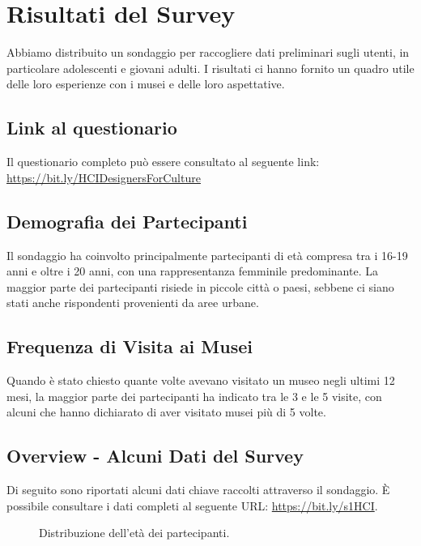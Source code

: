 \documentclass{article}
\begin{document}
\section{Risultati del Survey}

Abbiamo distribuito un sondaggio per raccogliere dati preliminari sugli utenti, in particolare adolescenti e giovani adulti. I risultati ci hanno fornito un quadro utile delle loro esperienze con i musei e delle loro aspettative.

\subsection{Link al questionario}

Il questionario completo può essere consultato al seguente link: \url{https://bit.ly/HCIDesignersForCulture}

\subsection{Demografia dei Partecipanti}

Il sondaggio ha coinvolto principalmente partecipanti di età compresa tra i 16-19 anni e oltre i 20 anni, con una rappresentanza femminile predominante. La maggior parte dei partecipanti risiede in piccole città o paesi, sebbene ci siano stati anche rispondenti provenienti da aree urbane.

\subsection{Frequenza di Visita ai Musei}

Quando è stato chiesto quante volte avevano visitato un museo negli ultimi 12 mesi, la maggior parte dei partecipanti ha indicato tra le 3 e le 5 visite, con alcuni che hanno dichiarato di aver visitato musei più di 5 volte.
\newpage
\subsection{Overview - Alcuni Dati del Survey}
Di seguito sono riportati alcuni dati chiave raccolti attraverso il sondaggio. È possibile consultare i dati completi al seguente URL: \url{https://bit.ly/s1HCI}.

\begin{figure}[h]
    \centering
    \caption{Distribuzione dell'età dei partecipanti.}
\end{figure}
\end{document}
